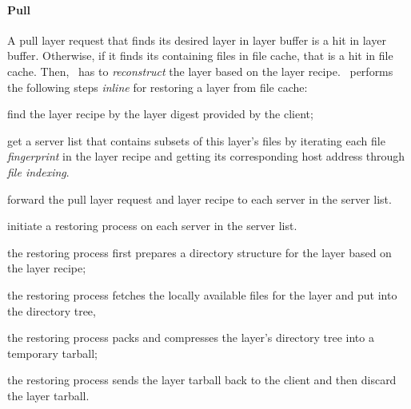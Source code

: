 \paragraph{Pull}
%
A pull layer request that finds its desired layer in layer buffer 
is a hit in layer buffer. 
Otherwise, if it finds its containing files in file cache, that is
a hit in file cache.
Then, \sysname~has to \emph{reconstruct} the layer based
on the layer recipe.
%
%
\sysname\ performs the following steps \emph{inline} for restoring a layer from file cache:
%
\begin{compactenumerate}
	\item find the layer recipe by the layer digest
	provided by the client;
	\item get a server list that contains subsets of this layer's files 
	by iterating each file \emph{fingerprint} in the layer recipe and getting its corresponding host address
	through \emph{file indexing}.
	\item forward the pull layer request and layer recipe to each server in the server list.
	\item initiate a restoring process on each server in the server list. 
	\item the restoring process first prepares a directory structure for the layer based on the layer recipe;
	\item the restoring process fetches the locally available files for the layer and put into the directory tree, 
	\item the restoring process packs and compresses the layer's directory tree into a temporary tarball;
	\item the restoring process sends the layer tarball back to the client and then discard the layer tarball.
\end{compactenumerate}
